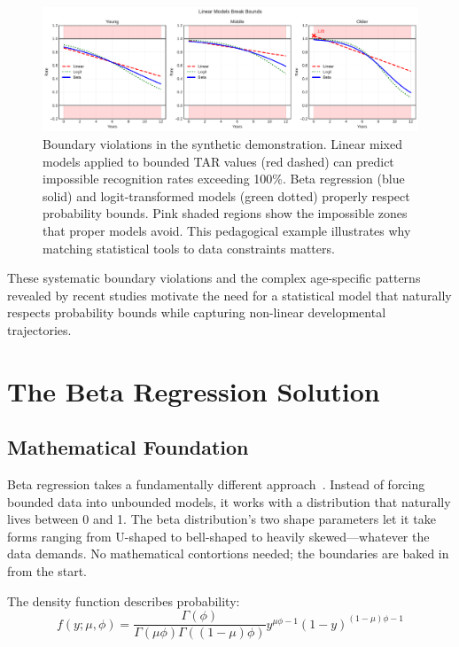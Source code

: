 \documentclass[10pt,journal,compsoc]{IEEEtran}
\begin{document}
\begin{figure}[htbp]
\centering
\includegraphics[width=\columnwidth]{boundary_violations.pdf}
\caption{Boundary violations in the synthetic demonstration. Linear mixed models applied to bounded TAR values (red dashed) can predict impossible recognition rates exceeding 100\%. Beta regression (blue solid) and logit-transformed models (green dotted) properly respect probability bounds. Pink shaded regions show the impossible zones that proper models avoid. This pedagogical example illustrates why matching statistical tools to data constraints matters.}
\label{fig:linear-violations}
\end{figure}

These systematic boundary violations and the complex age-specific patterns revealed by recent studies motivate the need for a statistical model that naturally respects probability bounds while capturing non-linear developmental trajectories.

\section{The Beta Regression Solution}
\label{sec:beta_regression}

\subsection{Mathematical Foundation}

Beta regression takes a fundamentally different approach~\cite{ferrari2004}. Instead of forcing bounded data into unbounded models, it works with a distribution that naturally lives between 0 and 1. The beta distribution's two shape parameters let it take forms ranging from U-shaped to bell-shaped to heavily skewed---whatever the data demands. No mathematical contortions needed; the boundaries are baked in from the start.

The density function describes probability:
\begin{equation}
f(y; \mu, \phi) = \frac{\Gamma(\phi)}{\Gamma(\mu\phi)\Gamma((1-\mu)\phi)} y^{\mu\phi-1} (1-y)^{(1-\mu)\phi-1}
\label{eq:beta_density}
\end{equation}
\end{document}
